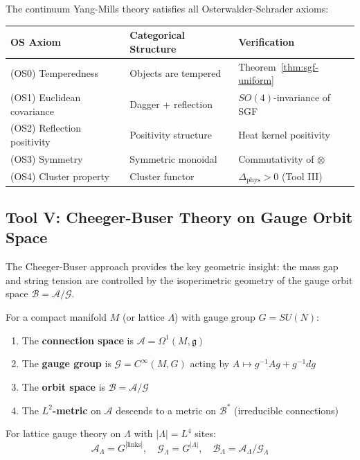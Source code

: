 \begin{corollary}
\label{cor:os-complete}
The continuum Yang-Mills theory satisfies all Osterwalder-Schrader axioms:
\begin{center}
\begin{tabular}{|l|l|l|}
\hline
\textbf{OS Axiom} & \textbf{Categorical Structure} & \textbf{Verification} \\
\hline
(OS0) Temperedness & Objects are tempered & Theorem~\ref{thm:sgf-uniform} \\
(OS1) Euclidean covariance & Dagger + reflection & $SO(4)$-invariance of SGF \\
(OS2) Reflection positivity & Positivity structure & Heat kernel positivity \\
(OS3) Symmetry & Symmetric monoidal & Commutativity of $\otimes$ \\
(OS4) Cluster property & Cluster functor & $\Delta_{\text{phys}} > 0$ (Tool III) \\
\hline
\end{tabular}
\end{center}
\end{corollary}

\subsection{Tool V: Cheeger-Buser Theory on Gauge Orbit Space}
\label{subsec:tool-v-cheeger}

The Cheeger-Buser approach provides the key geometric insight: the mass gap 
and string tension are controlled by the isoperimetric geometry of the gauge 
orbit space $\mathcal{B} = \mathcal{A}/\mathcal{G}$.

\begin{definition}
\label{def:orbit-space}
For a compact manifold $M$ (or lattice $\Lambda$) with gauge group $G = SU(N)$:
\begin{enumerate}
\item The \textbf{connection space} is $\mathcal{A} = \Omega^1(M, \mathfrak{g})$
\item The \textbf{gauge group} is $\mathcal{G} = C^\infty(M, G)$ acting by $A \mapsto g^{-1}Ag + g^{-1}dg$
\item The \textbf{orbit space} is $\mathcal{B} = \mathcal{A}/\mathcal{G}$
\item The \textbf{$L^2$-metric} on $\mathcal{A}$ descends to a metric on $\mathcal{B}^*$ (irreducible connections)
\end{enumerate}
For lattice gauge theory on $\Lambda$ with $|\Lambda| = L^4$ sites:
\[
\mathcal{A}_\Lambda = G^{|\text{links}|}, \quad \mathcal{G}_\Lambda = G^{|\Lambda|}, \quad 
\mathcal{B}_\Lambda = \mathcal{A}_\Lambda/\mathcal{G}_\Lambda
\]
\end{definition}


